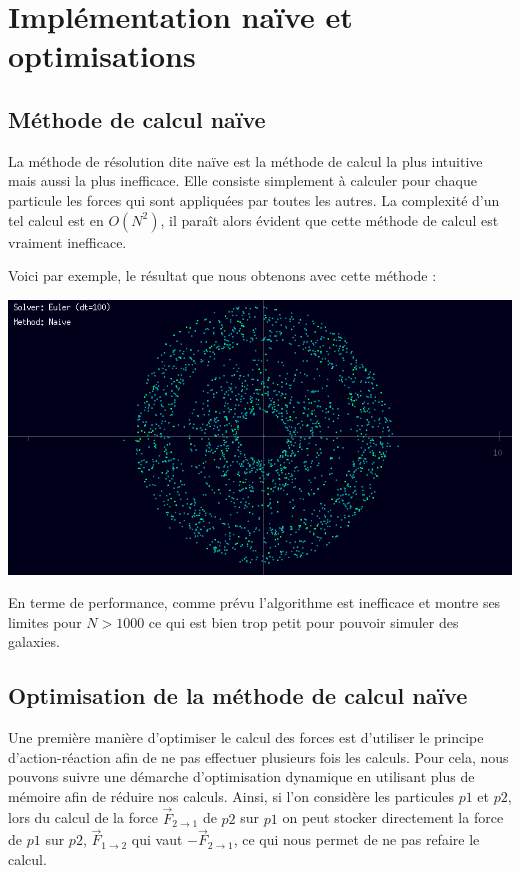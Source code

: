 \chapter{Implémentation naïve et optimisations}

\section{Méthode de calcul naïve}

La méthode de résolution dite naïve est la méthode de calcul la plus intuitive mais aussi la plus inefficace. Elle consiste simplement à calculer pour chaque particule les forces qui sont appliquées par toutes les autres. La complexité d'un tel calcul est en $O(N^2)$, il paraît alors évident que cette méthode de calcul est vraiment inefficace.

Voici par exemple, le résultat que nous obtenons avec cette méthode :

\begin{center}
\includegraphics[scale=0.8]{images/naive.png}
\captionsetup{hypcap=false}
\label{fig2}
\end{center}

En terme de performance, comme prévu l'algorithme est inefficace et montre ses limites pour $N>1000$ ce qui est bien trop petit pour pouvoir simuler des galaxies.

\section{Optimisation de la méthode de calcul naïve}
\vspace{2mm}

Une première manière d'optimiser le calcul des forces est d'utiliser le principe d'action-réaction afin de ne pas effectuer plusieurs fois les calculs.
Pour cela, nous pouvons suivre une démarche d'optimisation dynamique en utilisant plus de mémoire afin de réduire nos calculs. Ainsi, si l'on considère les particules $p1$ et $p2$, lors du calcul de la force $\vec{F}_{2 \rightarrow 1}$ de $p2$ sur $p1$ on peut stocker directement la force de $p1$ sur $p2$, $\vec{F}_{1 \rightarrow 2}$ qui vaut $-\vec{F}_{2 \rightarrow 1}$, ce qui nous permet de ne pas refaire le calcul.

